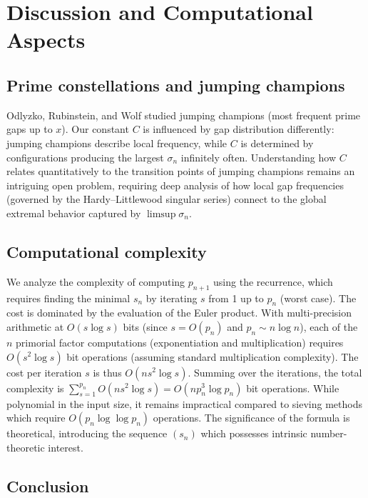 \documentclass[12pt]{article}
\theoremstyle{plain}
\theoremstyle{definition}
\theoremstyle{remark}
\begin{document}
\section{Discussion and Computational Aspects}

\subsection{Prime constellations and jumping champions}

Odlyzko, Rubinstein, and Wolf \cite{OdlyzkoRubinstein1999} studied jumping champions (most frequent prime gaps up to $x$). Our constant $C$ is influenced by gap distribution differently: jumping champions describe local frequency, while $C$ is determined by configurations producing the largest $\sigma_n$ infinitely often. Understanding how $C$ relates quantitatively to the transition points of jumping champions remains an intriguing open problem, requiring deep analysis of how local gap frequencies (governed by the Hardy--Littlewood singular series) connect to the global extremal behavior captured by $\limsup \sigma_n$.

\subsection{Computational complexity}

We analyze the complexity of computing $p_{n+1}$ using the recurrence, which requires finding the minimal $s_n$ by iterating $s$ from 1 up to $p_n$ (worst case). The cost is dominated by the evaluation of the Euler product. With multi-precision arithmetic at $O(s \log s)$ bits (since $s = O(p_n)$ and $p_n \sim n \log n$), each of the $n$ primorial factor computations (exponentiation and multiplication) requires $O(s^2 \log s)$ bit operations (assuming standard multiplication complexity). The cost per iteration $s$ is thus $O(n s^2 \log s)$. Summing over the iterations, the total complexity is $\sum_{s=1}^{p_n} O(n s^2 \log s) = O(n p_n^3 \log p_n)$ bit operations. While polynomial in the input size, it remains impractical compared to sieving methods which require $O(p_n \log \log p_n)$ operations. The significance of the formula is theoretical, introducing the sequence $(s_n)$ which possesses intrinsic number-theoretic interest.

\subsection{Conclusion}
\end{document}
